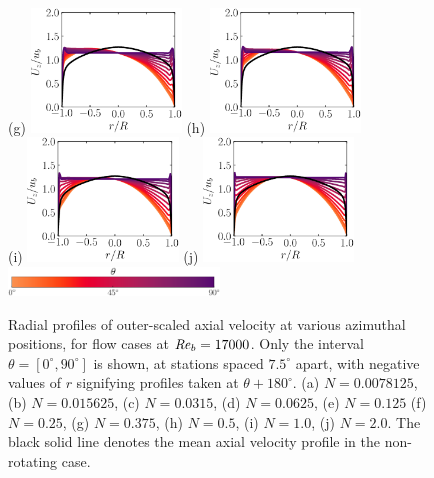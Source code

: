 \documentclass[lineno]{jfm}
\begin{document}
\begin{figure}
                (g) \includegraphics[width=4cm]{Figures/prof_uzub_rotz0_roty0.1875.eps}
                (h) \includegraphics[width=4cm]{Figures/prof_uzub_rotz0_roty0.25.eps} \\
                (i) \includegraphics[width=4cm]{Figures/prof_uzub_rotz0_roty0.5.eps}
		(j) \includegraphics[width=4cm]{Figures/prof_uzub_rotz0_roty1.0.eps} \\ 
    		\includegraphics[width=0.5\textwidth]{Figures/theta_cmap_half.eps}
     		\caption{
    		Radial profiles of 
    		outer-scaled axial velocity 
    		at various azimuthal positions, 
		for flow cases at $\mbox{\textit{Re}}_b=17000$.
		Only the interval $\theta = [0^{\circ},90^{\circ}]$ is shown, at stations
		spaced $7.5^\circ$ apart, with negative values of $r$ signifying profiles
		taken at $\theta + 180^{\circ}$.
                (a) $N = 0.0078125$,
                (b) $N = 0.015625$,
                (c) $N = 0.0315$,
                (d) $N = 0.0625$,
                (e) $N = 0.125$
                (f) $N = 0.25$,
                (g) $N = 0.375$,
                (h) $N = 0.5$,
                (i) $N = 1.0$,
                (j) $N = 2.0$.
		The black solid line denotes the mean axial velocity profile in the
    		non-rotating case.
    	}
	\label{fig:uprof}
	\end{figure}
\end{document}
